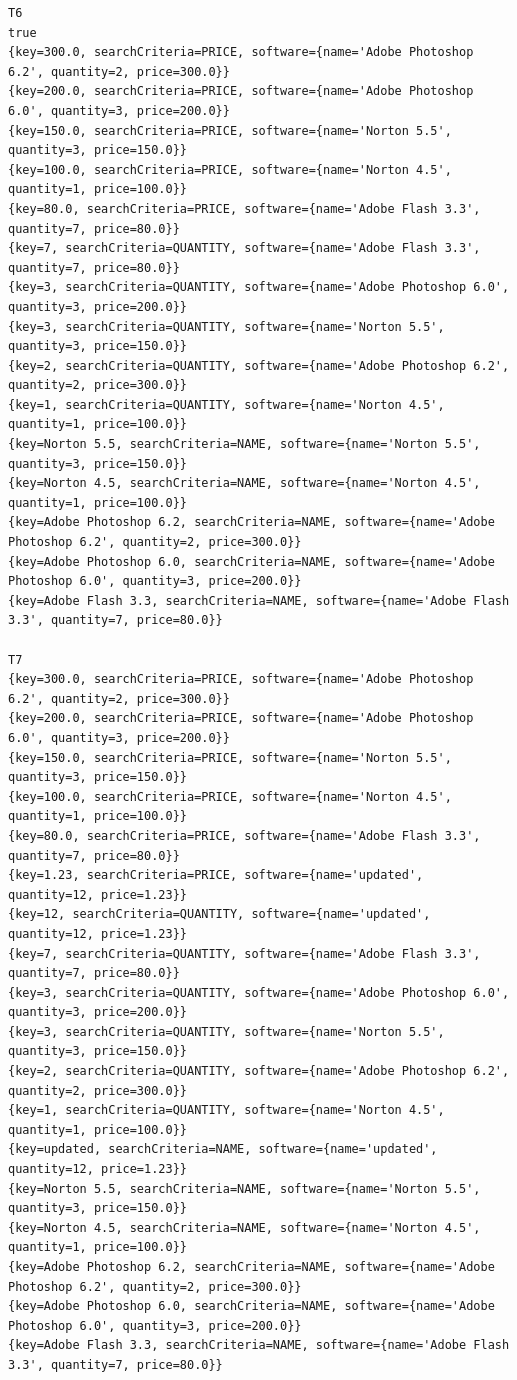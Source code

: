 \documentclass[a4paper]{article}
\begin{document}
\begin{large}
\begin{lstlisting}
T6
true
{key=300.0, searchCriteria=PRICE, software={name='Adobe Photoshop 6.2', quantity=2, price=300.0}}
{key=200.0, searchCriteria=PRICE, software={name='Adobe Photoshop 6.0', quantity=3, price=200.0}}
{key=150.0, searchCriteria=PRICE, software={name='Norton 5.5', quantity=3, price=150.0}}
{key=100.0, searchCriteria=PRICE, software={name='Norton 4.5', quantity=1, price=100.0}}
{key=80.0, searchCriteria=PRICE, software={name='Adobe Flash 3.3', quantity=7, price=80.0}}
{key=7, searchCriteria=QUANTITY, software={name='Adobe Flash 3.3', quantity=7, price=80.0}}
{key=3, searchCriteria=QUANTITY, software={name='Adobe Photoshop 6.0', quantity=3, price=200.0}}
{key=3, searchCriteria=QUANTITY, software={name='Norton 5.5', quantity=3, price=150.0}}
{key=2, searchCriteria=QUANTITY, software={name='Adobe Photoshop 6.2', quantity=2, price=300.0}}
{key=1, searchCriteria=QUANTITY, software={name='Norton 4.5', quantity=1, price=100.0}}
{key=Norton 5.5, searchCriteria=NAME, software={name='Norton 5.5', quantity=3, price=150.0}}
{key=Norton 4.5, searchCriteria=NAME, software={name='Norton 4.5', quantity=1, price=100.0}}
{key=Adobe Photoshop 6.2, searchCriteria=NAME, software={name='Adobe Photoshop 6.2', quantity=2, price=300.0}}
{key=Adobe Photoshop 6.0, searchCriteria=NAME, software={name='Adobe Photoshop 6.0', quantity=3, price=200.0}}
{key=Adobe Flash 3.3, searchCriteria=NAME, software={name='Adobe Flash 3.3', quantity=7, price=80.0}}

T7
{key=300.0, searchCriteria=PRICE, software={name='Adobe Photoshop 6.2', quantity=2, price=300.0}}
{key=200.0, searchCriteria=PRICE, software={name='Adobe Photoshop 6.0', quantity=3, price=200.0}}
{key=150.0, searchCriteria=PRICE, software={name='Norton 5.5', quantity=3, price=150.0}}
{key=100.0, searchCriteria=PRICE, software={name='Norton 4.5', quantity=1, price=100.0}}
{key=80.0, searchCriteria=PRICE, software={name='Adobe Flash 3.3', quantity=7, price=80.0}}
{key=1.23, searchCriteria=PRICE, software={name='updated', quantity=12, price=1.23}}
{key=12, searchCriteria=QUANTITY, software={name='updated', quantity=12, price=1.23}}
{key=7, searchCriteria=QUANTITY, software={name='Adobe Flash 3.3', quantity=7, price=80.0}}
{key=3, searchCriteria=QUANTITY, software={name='Adobe Photoshop 6.0', quantity=3, price=200.0}}
{key=3, searchCriteria=QUANTITY, software={name='Norton 5.5', quantity=3, price=150.0}}
{key=2, searchCriteria=QUANTITY, software={name='Adobe Photoshop 6.2', quantity=2, price=300.0}}
{key=1, searchCriteria=QUANTITY, software={name='Norton 4.5', quantity=1, price=100.0}}
{key=updated, searchCriteria=NAME, software={name='updated', quantity=12, price=1.23}}
{key=Norton 5.5, searchCriteria=NAME, software={name='Norton 5.5', quantity=3, price=150.0}}
{key=Norton 4.5, searchCriteria=NAME, software={name='Norton 4.5', quantity=1, price=100.0}}
{key=Adobe Photoshop 6.2, searchCriteria=NAME, software={name='Adobe Photoshop 6.2', quantity=2, price=300.0}}
{key=Adobe Photoshop 6.0, searchCriteria=NAME, software={name='Adobe Photoshop 6.0', quantity=3, price=200.0}}
{key=Adobe Flash 3.3, searchCriteria=NAME, software={name='Adobe Flash 3.3', quantity=7, price=80.0}}  
  \end{lstlisting}
  

\end{large}
\end{document}
